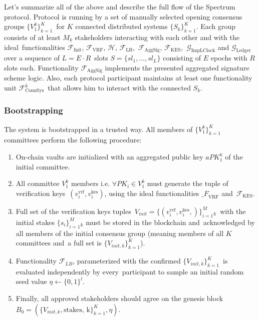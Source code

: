 Let's summarize all of the above and describe the full flow of the Spectrum protocol.
Protocol is running by a set of manually selected opening consensus groups $\{V^k_1\}_{k=1}^K$\
for $K$ connected distributed systems $\{S_k\}_{k=1}^K$.
Each group consists of at least $M_k$ stakeholders interacting with each other and with the ideal\
functionalities $\mathcal{F}_{\text{Init}}$, ${\mathcal{F}}_{\text{VRF}}$, $\mathcal{H}$, ${\mathcal{F}}_{\text{LB}}$,\
$\mathcal{F}_{\text{AggSig}}$, ${\mathcal{F}}_{\text{KES}}$,\
$\mathcal{G}_{\text{ImpLClock}}$ and $\mathcal{G}_{\text{Ledger}}$ over a sequence of $L = E \cdot R$\
slots ${S=\{sl_1,\dots,sl_L\}}$ consisting of $E$ epochs with $R$ slots each.
Functionality ${\mathcal{F}}_{\text{AggSig}}$ implements the presented aggregated signature scheme logic.
Also, each protocol participant maintains at least one functionality unit  $\mathcal{F}^k_{\text{ConnSys}}$\
that allows him to interact with the connected $S_k$.

\subsubsection{Bootstrapping}\label{subsubsec:bootstrapping}

The system is bootstrapped in a trusted way.
All members of $\{V^k_1\}_{k=1}^K$ committees perform the following procedure:
\begin{enumerate}
    \item On-chain vaults are initialized with an aggregated public key $aPK^k_1$ of the initial committee.

    \item All committee $V^k_1$ members i.e. $\forall PK_i \in V^k_1$ must generate the tuple of verification keys\
    ${(v_i^{\text{vrf}}, v_i^{\text{kes}})}$, using the ideal functionalities ${\mathcal_{F}}_{\text{VRF}}$ and\
    ${\mathcal{F}}_{\text{KES}}$.

    \item Full set of the verification keys tuples\
    ${V_{init} = \{(v_i^{\text{vrf}}, v_i^{\text{kes}},)\}_{i=1}^M_k}$\
    with the initial stakes $\{s_i\}_{i=1}^M_k$ must be stored in the blockchain and\
    acknowledged by all members of the initial consensus group (meaning members of all $K$ committees and\
    a full set is $\{V_{init, k}\}_{k=1}^{K}$).

    \item Functionality ${\mathcal{F}}_{LB}$, parameterized with the confirmed $\{V_{init, k}\}_{k=1}^{K}$\
    is evaluated independently by every\
    participant to sample an initial random seed value $\eta \leftarrow \{0, 1\}^l$.

    \item Finally, all approved stakeholders should agree on the genesis block\
    ${B_0=\left(\{V_{init, k}, \text{stakes, k}\}_{k=1}^{K}, \eta\right)}$.
\end{enumerate}

